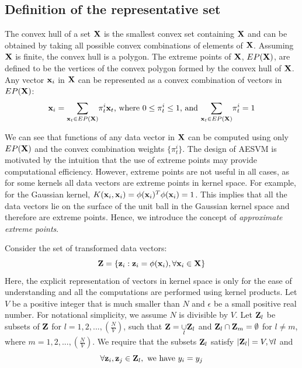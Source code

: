 \documentclass[twoside]{article}
\begin{document}
\subsection{Definition of the representative set} \label{sec:RPdef}

The convex hull of a set ${\bf X}$ is the smallest convex set containing ${\bf X}$ \citep{rockafellar} and can be obtained by taking all possible convex combinations of elements of ${\bf X}$. Assuming ${\bf X}$ is finite, the convex hull is a polygon. The extreme points of ${\bf X}$, $EP({\bf X})$, are defined to be the vertices of the convex polygon formed by the convex hull of ${\bf X}$. Any  vector ${\bf x}_i$ in ${\bf X}$ can be represented as a convex combination of vectors in $EP({\bf X})$:
\begin{equation*}
{\bf x}_i = \underset{{\bf x}_t \in EP({\bf X})}{\sum} \pi^i _t {\bf x}_t \text{, where } 0 \le \pi^i _t \le 1 \text{, and } \underset{{\bf x}_t \in EP({\bf X})}{\sum} \pi^i _t = 1
\end{equation*}

We can see that functions of any data vector in ${\bf X}$ can be computed using only $EP({\bf X})$ and the convex combination weights $\{\pi^i _t\}$. The design of AESVM is motivated by the intuition that the use of extreme points may provide computational efficiency. However, extreme points are not useful in all cases, as for some kernels all data vectors are extreme points in kernel space. For example, for the Gaussian kernel, $K({\bf x}_i,{\bf x}_i) = \phi({\bf x}_i)^T\phi({\bf x}_i) = 1$. This implies that all the data vectors lie on the surface of the unit ball in the Gaussian kernel space and therefore are extreme points. Hence, we introduce the concept of {\em approximate extreme points}.

Consider the set of transformed data vectors:
\begin{equation}\label{eq:Zdef}
{\bf Z} = \{{\bf z}_i:{\bf z}_i = \phi({\bf x}_i), \forall {\bf x}_i \in {\bf X}\}
\end{equation}
Here, the explicit representation of vectors in kernel space is only for the ease of understanding and all the computations are performed using kernel products. Let $V$ be a positive integer that is much smaller than $N$ and $\epsilon$ be a small positive real number. For notational simplicity, we assume $N$ is divisible by $V$.  Let ${\bf Z}_l$ be subsets of ${\bf Z}$ for $l = 1,2,...,(\frac{N}{V})$, such that ${\bf Z} = \underset{l}{\cup} {\bf Z}_l$ and ${\bf Z}_l \cap {\bf Z}_m = \emptyset$ for $l \neq m$, where $m = 1,2,...,(\frac{N}{V})$.  We require that the subsets ${\bf Z}_l$ satisfy  $|{\bf Z}_l| = V, \forall l$ and
\begin{equation} \label{eq:RPyProp}
\forall {\bf z}_i, {\bf z}_j \in {\bf Z}_l,\text{ we have } y_i = y_j
\end{equation}
\end{document}
